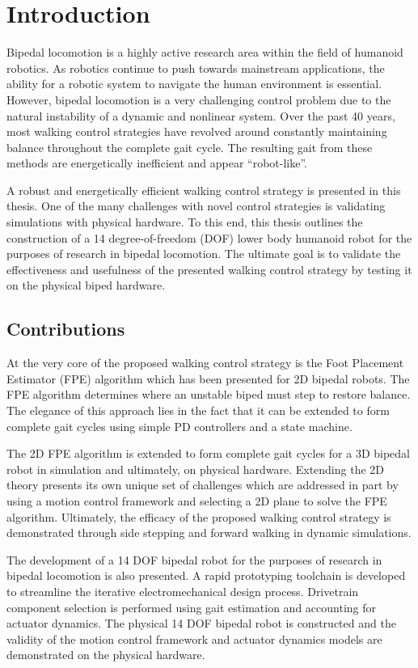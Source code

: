 \chapter{Introduction} %
\label{cha:introduction}
Bipedal locomotion is a highly active research area within the field of humanoid robotics. As robotics continue to push towards mainstream applications, the ability for a robotic system to navigate the human environment is essential. However, bipedal locomotion is a very challenging control problem due to the natural instability of a dynamic and nonlinear system. Over the past 40 years, most walking control strategies have revolved around constantly maintaining balance throughout the complete gait cycle. The resulting gait from these methods are energetically inefficient and appear ``robot-like''. 

A robust and energetically efficient walking control strategy is presented in this thesis. One of the many challenges with novel control strategies is validating simulations with physical hardware. To this end, this thesis outlines the construction of a 14 degree-of-freedom (DOF) lower body humanoid robot for the purposes of research in bipedal locomotion. The ultimate goal is to validate the effectiveness and usefulness of the presented walking control strategy by testing it on the physical biped hardware. 

\section{Contributions} %
\label{sec:contributions}
At the very core of the proposed walking control strategy is the Foot Placement Estimator (FPE) algorithm which has been presented for 2D bipedal robots. The FPE algorithm determines where an unstable biped must step to restore balance. The elegance of this approach lies in the fact that it can be extended to form complete gait cycles using simple PD controllers and a state machine. 

The 2D FPE algorithm is extended to form complete gait cycles for a 3D bipedal robot in simulation and ultimately, on physical hardware. Extending the 2D theory presents its own unique set of challenges which are addressed in part by using a motion control framework and selecting a 2D plane to solve the FPE algorithm. Ultimately, the efficacy of the proposed walking control strategy is demonstrated through side stepping and forward walking in dynamic simulations. 

The development of a 14 DOF bipedal robot for the purposes of research in bipedal locomotion is also presented. A rapid prototyping toolchain is developed to streamline the iterative electromechanical design process. Drivetrain component selection is performed using gait estimation and accounting for actuator dynamics. The physical 14 DOF bipedal robot is constructed and the validity of the motion control framework and actuator dynamics models are demonstrated on the physical hardware. 

